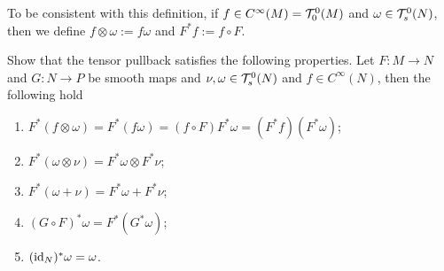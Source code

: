 To be consistent with this definition, if $f\in C^\infty(M) = \mathcal{T}_0^0(M)$ and $\omega \in\mathcal{T}_s^0(N)$, then we define $f\otimes \omega := f\omega$ and $F^* f := f\circ F$.

\begin{exercise}
	Show that the tensor pullback satisfies the following properties.
	Let $F:M\to N$ and $G:N\to P$ be smooth maps and $\nu, \omega \in\mathcal{T}_s^0(N)$ and $f\in C^\infty(N)$, then the following hold
	\begin{enumerate}
		\item $F^*(f\otimes\omega) = F^*(f \omega) = (f\circ F) F^*\omega = (F^* f)(F^*\omega)$;
		\item $F^*(\omega\otimes\nu) = F^*\omega\otimes F^*\nu$;
		\item $F^*(\omega + \nu) = F^*\omega + F^*\nu$;
		\item $(G\circ F)^*\omega = F^*(G^* \omega)$;
		\item $(\operatorname{id}_N)^* \omega = \omega$.
	\end{enumerate}
\end{exercise}

